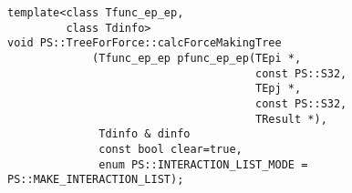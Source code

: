 
\begin{screen}
\begin{verbatim}
template<class Tfunc_ep_ep,
         class Tdinfo>
void PS::TreeForForce::calcForceMakingTree
             (Tfunc_ep_ep pfunc_ep_ep(TEpi *,
                                      const PS::S32,
                                      TEpj *,
                                      const PS::S32,
                                      TResult *),
              Tdinfo & dinfo
              const bool clear=true,
              enum PS::INTERACTION_LIST_MODE = PS::MAKE_INTERACTION_LIST);
\end{verbatim}
\end{screen}

